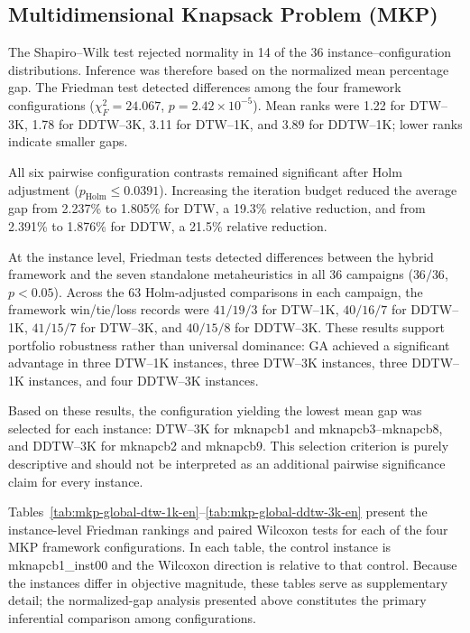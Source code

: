 \subsection{Multidimensional Knapsack Problem (MKP)}
\label{sec:statistical-mkp-en}

The Shapiro--Wilk test rejected normality in 14 of the 36
instance--configuration distributions. Inference was therefore based on the
normalized mean percentage gap. The Friedman test detected differences among
the four framework configurations ($\chi_F^2=24.067$,
$p=2.42\times10^{-5}$). Mean ranks were 1.22 for DTW--3K, 1.78 for DDTW--3K,
3.11 for DTW--1K, and 3.89 for DDTW--1K; lower ranks indicate smaller gaps.

All six pairwise configuration contrasts remained significant after Holm
adjustment ($p_{\mathrm{Holm}}\leq0.0391$). Increasing the iteration budget
reduced the average gap from 2.237\% to 1.805\% for DTW, a 19.3\% relative
reduction, and from 2.391\% to 1.876\% for DDTW, a 21.5\% relative reduction.

At the instance level, Friedman tests detected differences between the hybrid
framework and the seven standalone metaheuristics in all 36 campaigns
($36/36$, $p<0.05$). Across the 63 Holm-adjusted comparisons in each campaign,
the framework win/tie/loss records were $41/19/3$ for DTW--1K, $40/16/7$ for
DDTW--1K, $41/15/7$ for DTW--3K, and $40/15/8$ for DDTW--3K. These results
support portfolio robustness rather than universal dominance: GA achieved a
significant advantage in three DTW--1K instances, three DTW--3K instances,
three DDTW--1K instances, and four DDTW--3K instances.

Based on these results, the configuration yielding the lowest mean gap was
selected for each instance: DTW--3K for mknapcb1 and mknapcb3--mknapcb8, and
DDTW--3K for mknapcb2 and mknapcb9. This selection criterion is purely
descriptive and should not be interpreted as an additional pairwise
significance claim for every instance.

Tables~\ref{tab:mkp-global-dtw-1k-en}--\ref{tab:mkp-global-ddtw-3k-en}
present the instance-level Friedman rankings and paired Wilcoxon tests for each
of the four MKP framework configurations. In each table, the control instance
is mknapcb1\_inst00 and the Wilcoxon direction is relative to that control.
Because the instances differ in objective magnitude, these tables serve as
supplementary detail; the normalized-gap analysis presented above constitutes
the primary inferential comparison among configurations.

